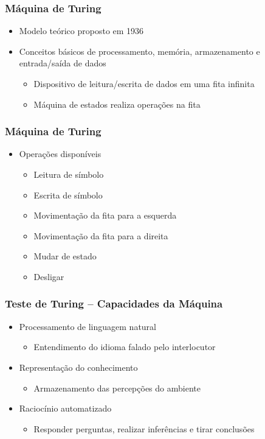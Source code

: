 \documentclass[aspectratio=169,
				xcolor=table]{beamer}
\begin{document}
	\begin{frame}
		\frametitle{Máquina de Turing}
		\begin{itemize}
			\item Modelo teórico proposto em 1936
			\vspace{1em}
			\item Conceitos básicos de processamento, memória, armazenamento e entrada/saída de dados
			\begin{itemize}
				\item Dispositivo de leitura/escrita de dados em uma fita infinita
				\item Máquina de estados realiza operações na fita
			\end{itemize}
		\end{itemize}
	\end{frame}
	
	\begin{frame}
		\frametitle{Máquina de Turing}
		\begin{itemize}
			\item Operações disponíveis
			\begin{itemize}
				\item Leitura de símbolo
				\item Escrita de símbolo
				\item Movimentação da fita para a esquerda
				\item Movimentação da fita para a direita
				\item Mudar de estado
				\item Desligar
			\end{itemize}
		\end{itemize}
	\end{frame}
	
	\begin{frame}
		\frametitle{Teste de Turing – Capacidades da Máquina}
		\begin{itemize}
			\item Processamento de linguagem natural
			\begin{itemize}
				\item Entendimento do idioma falado pelo interlocutor
			\end{itemize}
			\vspace{1em}
			\item Representação do conhecimento
			\begin{itemize}
				\item Armazenamento das percepções do ambiente
			\end{itemize}
			\vspace{1em}
			\item Raciocínio automatizado
			\begin{itemize}
				\item Responder perguntas, realizar inferências e tirar conclusões
			\end{itemize}
		\end{itemize}
	\end{frame}	
\end{document}

